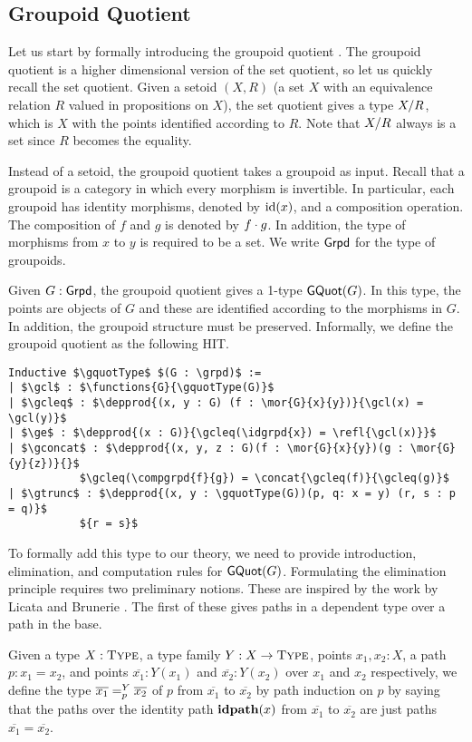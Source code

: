 \subsection{Groupoid Quotient}
Let us start by formally introducing the groupoid quotient \cite{sojakovaPhD}.
The groupoid quotient is a higher dimensional version of the set quotient,
so let us quickly recall the set quotient.
Given a setoid $(X,R)$ (a set $X$ with an equivalence relation $R$ valued in propositions on $X$),
the set quotient gives a type $\quot{X}{R}$, which is $X$ with the points identified according to $R$.
Note that $\quot{X}{R}$ always is a set since $R$ becomes the equality.

Instead of a setoid, the groupoid quotient takes a groupoid as input.
Recall that a groupoid is a category in which every morphism is invertible.
In particular, each groupoid has identity morphisms, denoted by $\idgrpd{x}$, and a composition operation.
The composition of $f$ and $g$ is denoted by $\compgrpd{f}{g}$.
In addition, the type of morphisms from $x$ to $y$ is required to be a set.
We write $\grpd$ for the type of groupoids.

Given $G : \grpd$, the groupoid quotient gives a 1-type $\gquotType(G)$.
In this type, the points are objects of $G$
and these are identified according to the morphisms in $G$.
In addition, the groupoid structure must be preserved.
Informally, we define the groupoid quotient as the following HIT.

\begin{lstlisting}[mathescape=true]
Inductive $\gquotType$ $(G : \grpd)$ :=
| $\gcl$ : $\functions{G}{\gquotType(G)}$
| $\gcleq$ : $\depprod{(x, y : G) (f : \mor{G}{x}{y})}{\gcl(x) = \gcl(y)}$
| $\ge$ : $\depprod{(x : G)}{\gcleq(\idgrpd{x}) = \refl{\gcl(x)}}$
| $\gconcat$ : $\depprod{(x, y, z : G)(f : \mor{G}{x}{y})(g : \mor{G}{y}{z})}{}$
           $\gcleq(\compgrpd{f}{g}) = \concat{\gcleq(f)}{\gcleq(g)}$
| $\gtrunc$ : $\depprod{(x, y : \gquotType(G))(p, q: x = y) (r, s : p = q)}$
           ${r = s}$
\end{lstlisting}

To formally add this type to our theory, we need to provide
introduction, elimination, and computation rules for $\gquotType(G)$.
Formulating the elimination principle requires two preliminary notions.
These are inspired by the work by Licata and Brunerie \cite{licata2015cubical}.
The first of these gives paths in a dependent type over a path in the base.

\begin{definition}
\label{def:path_over}
Given a type $X : \Type$,
a type family $Y : \functions{X}{\Type}$,
points $x_1, x_2 : X$,
a path $p : x_1 = x_2$,
and points $\overline{x_1} : Y(x_1)$ and $\overline{x_2} : Y(x_2)$ over $x_1$ and $x_2$ respectively,
we define the type $\pathover[Y]{p}{\overline{x_1}}{\overline{x_2}}$ of  $p$ from $\overline{x_1}$ to $\overline{x_2}$ by path induction on $p$
by saying that the paths over the identity path $\refl{x}$ from $\overline{x_1}$ to $\overline{x_2}$ are just paths $\overline{x_1} = \overline{x_2}$.
\end{definition}

